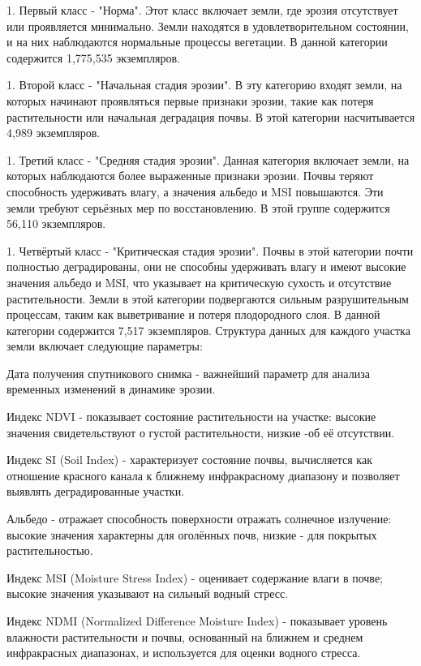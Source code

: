1. Первый класс - "Норма". Этот класс включает земли, где эрозия
отсутствует или проявляется минимально. Земли находятся в
удовлетворительном состоянии, и на них наблюдаются нормальные процессы
вегетации. В данной категории содержится 1,775,535 экземпляров.

1. Второй класс - "Начальная стадия эрозии". В эту категорию входят
земли, на которых начинают проявляться первые признаки эрозии, такие
как потеря растительности или начальная деградация почвы. В этой
категории насчитывается 4,989 экземпляров.

1. Третий класс - "Средняя стадия эрозии". Данная категория включает
земли, на которых наблюдаются более выраженные признаки эрозии. Почвы
теряют способность удерживать влагу, а значения альбедо и MSI
повышаются. Эти земли требуют серьёзных мер по восстановлению. В этой
группе содержится 56,110 экземпляров.

1. Четвёртый класс - "Критическая стадия эрозии". Почвы в этой категории
почти полностью деградированы, они не способны удерживать влагу и
имеют высокие значения альбедо и MSI, что указывает на критическую
сухость и отсутствие растительности. Земли в этой категории
подвергаются сильным разрушительным процессам, таким как выветривание
и потеря плодородного слоя. В данной категории содержится 7,517
экземпляров.
Структура данных для каждого участка земли включает следующие параметры:

Дата получения спутникового снимка - важнейший параметр для анализа
временных изменений в динамике эрозии.

Индекс NDVI - показывает состояние растительности на участке: высокие
значения свидетельствуют о густой растительности, низкие -об её
отсутствии.

Индекс SI (Soil Index) - характеризует состояние почвы, вычисляется как
отношение красного канала к ближнему инфракрасному диапазону и позволяет
выявлять деградированные участки.

Альбедо - отражает способность поверхности отражать солнечное излучение:
высокие значения характерны для оголённых почв, низкие - для покрытых
растительностью.

Индекс MSI (Moisture Stress Index) - оценивает содержание влаги в почве;
высокие значения указывают на сильный водный стресс.

Индекс NDMI (Normalized Difference Moisture Index) - показывает уровень
влажности растительности и почвы, основанный на ближнем и среднем
инфракрасных диапазонах, и используется для оценки водного стресса.

